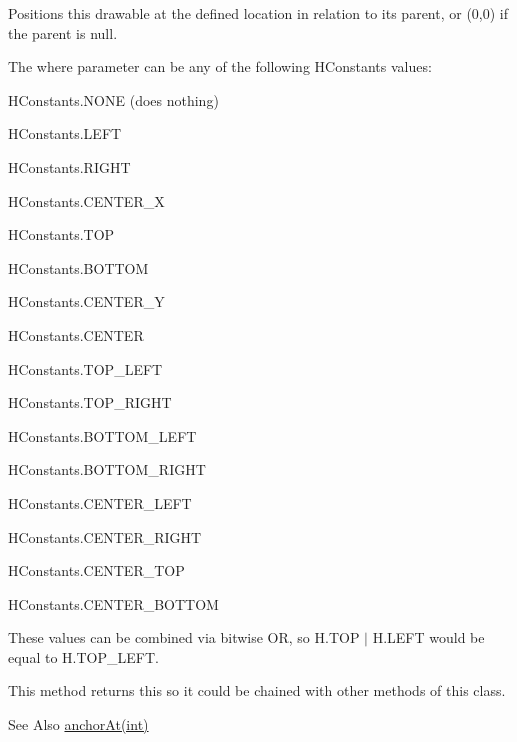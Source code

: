 Positions this drawable at the defined location in relation to its parent, or (0,0) if the parent is null. 

The {\ttfamily where} parameter can be any of the following H\-Constants values\-:
\begin{DoxyItemize}
\item {\ttfamily H\-Constants.\-N\-O\-N\-E} (does nothing)
\item {\ttfamily H\-Constants.\-L\-E\-F\-T}
\item {\ttfamily H\-Constants.\-R\-I\-G\-H\-T}
\item {\ttfamily H\-Constants.\-C\-E\-N\-T\-E\-R\-\_\-\-X}
\item {\ttfamily H\-Constants.\-T\-O\-P}
\item {\ttfamily H\-Constants.\-B\-O\-T\-T\-O\-M}
\item {\ttfamily H\-Constants.\-C\-E\-N\-T\-E\-R\-\_\-\-Y}
\item {\ttfamily H\-Constants.\-C\-E\-N\-T\-E\-R}
\item {\ttfamily H\-Constants.\-T\-O\-P\-\_\-\-L\-E\-F\-T}
\item {\ttfamily H\-Constants.\-T\-O\-P\-\_\-\-R\-I\-G\-H\-T}
\item {\ttfamily H\-Constants.\-B\-O\-T\-T\-O\-M\-\_\-\-L\-E\-F\-T}
\item {\ttfamily H\-Constants.\-B\-O\-T\-T\-O\-M\-\_\-\-R\-I\-G\-H\-T}
\item {\ttfamily H\-Constants.\-C\-E\-N\-T\-E\-R\-\_\-\-L\-E\-F\-T}
\item {\ttfamily H\-Constants.\-C\-E\-N\-T\-E\-R\-\_\-\-R\-I\-G\-H\-T}
\item {\ttfamily H\-Constants.\-C\-E\-N\-T\-E\-R\-\_\-\-T\-O\-P}
\item {\ttfamily H\-Constants.\-C\-E\-N\-T\-E\-R\-\_\-\-B\-O\-T\-T\-O\-M}
\end{DoxyItemize}

These values can be combined via bitwise O\-R, so {\ttfamily H.\-T\-O\-P $|$ H.\-L\-E\-F\-T} would be equal to {\ttfamily H.\-T\-O\-P\-\_\-\-L\-E\-F\-T}.

This method returns {\ttfamily this} so it could be chained with other methods of this class. \begin{DoxySeeAlso}{See Also}
\hyperlink{classhype_1_1core_1_1drawable_1_1_h_drawable_ab75ab965c009e70676767ba88016053c}{anchor\-At(int)} 
\end{DoxySeeAlso}

